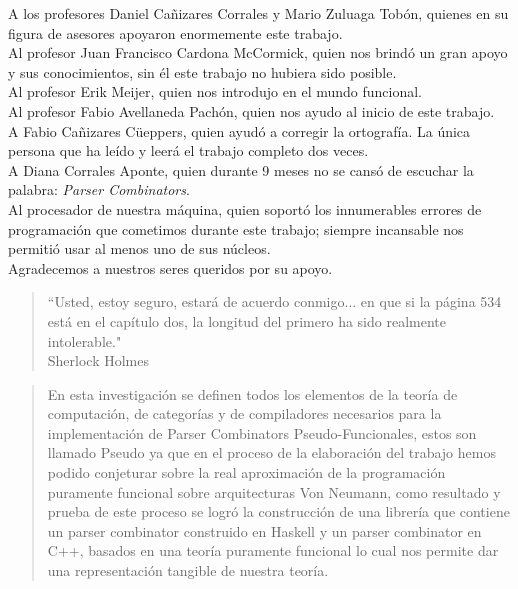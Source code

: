 \begin{acknowledgments}
A los profesores Daniel Cañizares Corrales y Mario Zuluaga Tobón, quienes en su figura de asesores apoyaron enormemente este trabajo.\\
Al profesor Juan Francisco Cardona McCormick, quien nos brindó un gran apoyo y sus conocimientos, sin él este trabajo no hubiera sido posible.\\
Al profesor Erik Meijer, quien nos introdujo en el mundo funcional.\\
Al profesor Fabio Avellaneda Pachón, quien nos ayudo al inicio de este trabajo.\\
A Fabio Cañizares Cüeppers, quien ayudó a corregir la ortografía. La única persona que ha leído y leerá el trabajo completo dos veces.\\
A Diana Corrales Aponte, quien durante 9 meses no se cansó de escuchar la palabra: \emph{Parser Combinators}.\\
Al procesador de nuestra máquina, quien soportó los innumerables errores de programación que cometimos durante este trabajo; siempre incansable nos permitió usar al menos uno de sus núcleos.\\



Agradecemos a nuestros seres queridos por su apoyo.\\
\vspace*{5cm}
\begin{quote}
	\hsp
	\em
	\raggedleft
	
	``Usted, estoy seguro, estará de acuerdo conmigo... en que si la página 534 está en el capítulo dos, la longitud del primero ha sido realmente intolerable."\\ Sherlock Holmes
	
\end{quote}

\end{acknowledgments}

\tableofcontents

\newpage

\begin{abstract}
\vspace{1cm}
En esta investigación se definen todos los elementos de la teoría de computación, de categorías y de compiladores necesarios para la implementación de Parser Combinators Pseudo-Funcionales, estos son llamado Pseudo ya que en el proceso de la elaboración del trabajo hemos podido conjeturar sobre la real aproximación de la programación puramente funcional sobre arquitecturas Von Neumann, como resultado y prueba de este proceso se logró la construcción de una librería que contiene un parser combinator construido en Haskell y un parser combinator en C++, basados en una teoría puramente funcional lo cual nos permite dar una representación tangible de nuestra teoría.
\end{abstract}

\startarabicpagination



